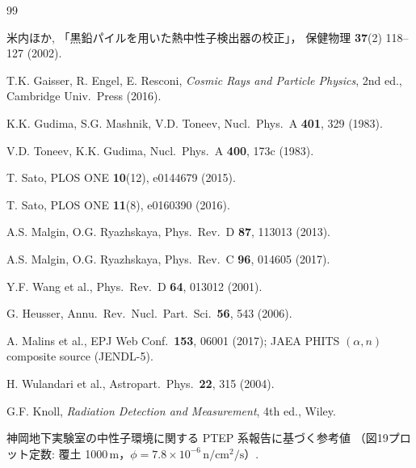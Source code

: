 \documentclass[a4paper,11pt]{ltjsarticle}
\begin{document}
\newpage
\begin{thebibliography}{99}

米内ほか,
「黒鉛パイルを用いた熱中性子検出器の校正」，
保健物理 \textbf{37}(2) 118--127 (2002).

T.K. Gaisser, R. Engel, E. Resconi,
\textit{Cosmic Rays and Particle Physics}, 2nd ed.,
Cambridge Univ.\ Press (2016).

K.K. Gudima, S.G. Mashnik, V.D. Toneev,
Nucl.\ Phys.\ A \textbf{401}, 329 (1983).

V.D. Toneev, K.K. Gudima,
Nucl.\ Phys.\ A \textbf{400}, 173c (1983).

T. Sato, PLOS ONE \textbf{10}(12), e0144679 (2015).

T. Sato, PLOS ONE \textbf{11}(8), e0160390 (2016).

A.S. Malgin, O.G. Ryazhskaya,
Phys.\ Rev.\ D \textbf{87}, 113013 (2013).

A.S. Malgin, O.G. Ryazhskaya,
Phys.\ Rev.\ C \textbf{96}, 014605 (2017).

Y.F. Wang et al.,
Phys.\ Rev.\ D \textbf{64}, 013012 (2001).

G. Heusser,
Annu.\ Rev.\ Nucl.\ Part.\ Sci.\ \textbf{56}, 543 (2006).

A. Malins et al.,
EPJ Web Conf.\ \textbf{153}, 06001 (2017);
JAEA PHITS $(\alpha,n)$ composite source (JENDL-5).

H. Wulandari et al.,
Astropart.\ Phys.\ \textbf{22}, 315 (2004).

G.F. Knoll,
\textit{Radiation Detection and Measurement}, 4th ed., Wiley.

神岡地下実験室の中性子環境に関する PTEP 系報告に基づく参考値
（図19プロット定数: 覆土 1000\,m，$\phi=7.8\times10^{-6}\,\mathrm{n/cm^2/s}$）.

\end{thebibliography}
\end{document}
